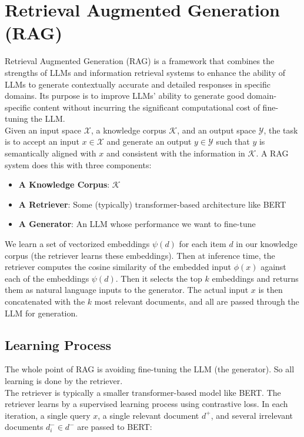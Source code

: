 \documentclass[12pt]{article}
\begin{document}
\section{Retrieval Augmented Generation (RAG)}
Retrieval Augmented Generation (RAG) is a framework that combines the strengths of LLMs and information retrieval systems to enhance the ability of LLMs to generate contextually accurate and detailed responses in specific domains. Its purpose is to improve LLMs' ability to generate good domain-specific content without incurring the significant computational cost of fine-tuning the LLM.\\

Given an input space \(\mathcal{X}\), a knowledge corpus \(\mathcal{K}\), and an output space \(\mathcal{Y}\), the task is to accept an input \(x \in \mathcal{X}\) and generate an output \(y \in \mathcal{Y}\) such that \(y\) is semantically aligned with \(x\) and consistent with the information in \(\mathcal{K}\). A RAG system does this with three components:
\begin{itemize}
\item \textbf{A Knowledge Corpus}: \(\mathcal{K}\)
\item \textbf{A Retriever}: Some (typically) transformer-based architecture like BERT
\item \textbf{A Generator}: An LLM whose performance we want to fine-tune
\end{itemize}
We learn a set of vectorized embeddings \(\psi(d)\) for each item \(d\) in our knowledge corpus (the retriever learns these embeddings). Then at inference time, the retriever computes the cosine similarity of the embedded input \(\phi(x)\) against each of the embeddings \(\psi(d)\). Then it selects the top \(k\) embeddings and returns them as natural language inputs to the generator. The actual input \(x\) is then concatenated with the \(k\) most relevant documents, and all are passed through the LLM for generation.

\subsection{Learning Process}
The whole point of RAG is avoiding fine-tuning the LLM (the generator). So all learning is done by the retriever. \\

The retriever is typically a smaller transformer-based model like BERT. The retriever learns by a supervised learning process using contrastive loss. In each iteration, a single query \(x\), a single relevant document \(d^+\), and several irrelevant documents \(d^-_i \in d^-\) are passed to BERT:
\end{document}
